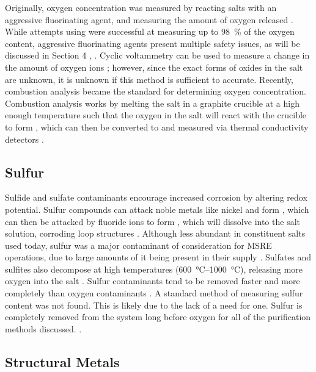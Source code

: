 Originally, oxygen concentration was measured by reacting salts with an
aggressive fluorinating agent, and measuring the amount of oxygen
released \cite{rev25}. While attempts using  were successful at
measuring up to \SI{98}{\percent} of the oxygen content, aggressive
fluorinating agents present multiple safety issues, as will be discussed in
Section 4 \cite{rev25}, \cite{rev26}. Cyclic voltammetry can be used to
measure a change in the amount of oxygen ions \cite{rev27}; however, since the
exact forms of oxides in the salt are unknown, it is unknown if this method
is sufficient to accurate. Recently, combustion analysis became the standard
for determining oxygen concentration. Combustion analysis works by melting
the salt in a graphite crucible at a high enough temperature such that the
oxygen in the salt will react with the crucible to form , which can
then be converted to  and measured via thermal conductivity
detectors \cite{rev26}. \par

\subsection{Sulfur}
\label{sec: sulfur}

Sulfide and sulfate contaminants encourage increased corrosion by altering
redox potential. Sulfur compounds can attack noble metals like nickel and
form , which can then be attacked by fluoride ions to form ,
which will dissolve into the salt solution, corroding loop structures
\cite{rev10,rev21}. Although less abundant in constituent salts used
today, sulfur was a major contaminant of consideration for MSRE operations,
due to large amounts of it being present in their  supply
\cite{rev10}. Sulfates and sulfites also decompose at high
temperatures (\qtyrange{600}{1000}{\celsius}), releasing more oxygen
into the salt \cite{rev29}.  Sulfur contaminants tend to be removed
faster and more completely than oxygen contaminants \cite{rev30}. A standard
method of measuring sulfur content was not found. This is likely due
to the lack of a need for one. Sulfur is completely removed from the
system long before oxygen for all of the purification methods
discussed. \cite{rev27,rev30,rev31,rev32}.\par

\subsection{Structural Metals}
\label{sec: structural metals}


